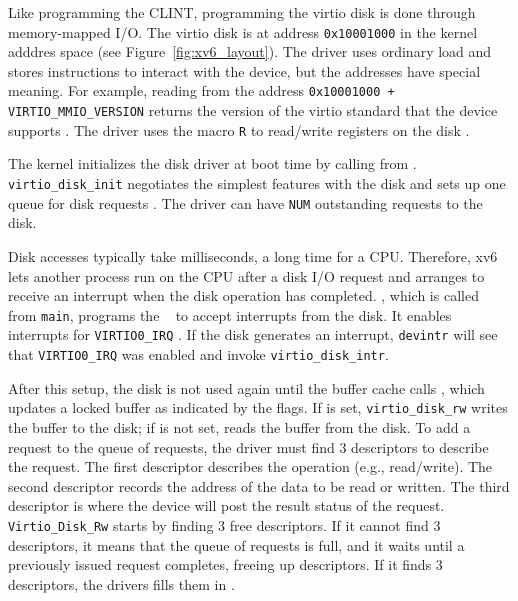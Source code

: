 Like programming the CLINT, programming the virtio disk is done
through memory-mapped I/O.  The virtio disk is at address
\lstinline{0x10001000} in the kernel adddres space (see
Figure~\ref{fig:xv6_layout}).  The driver uses ordinary load and
stores instructions to interact with the device, but the addresses
have special meaning.  For example, reading from the address
\lstinline{0x10001000 + VIRTIO_MMIO_VERSION}
 returns the version of the virtio
standard that the device supports
.  The driver uses the
macro \lstinline{R} to read/write registers on the disk
.

The kernel initializes the disk driver at boot time by calling
 from
 .
\lstinline{virtio_disk_init} negotiates the simplest features with the
disk  and sets
up one queue for disk requests .  The driver can have
\lstinline{NUM} outstanding requests to the disk.

Disk accesses typically take milliseconds, a long time for a
CPU.  Therefore, xv6 lets another process run on the CPU after a
disk I/O request and arranges to receive an interrupt when the disk
operation has completed.  
, which is called from \lstinline{main}, programs
the ~\cite{riscv:priv} to
accept interrupts from the disk.  It enables interrupts for
\lstinline{VIRTIO0_IRQ} .  If the
disk generates an interrupt, \lstinline{devintr}
 will see that
\lstinline{VIRTIO0_IRQ} was enabled and invoke
\lstinline{virtio_disk_intr}.

After this setup, the disk is not used again until the buffer cache calls
,
which updates a locked buffer
as indicated by the flags.
If
is set,
\lstinline{virtio_disk_rw}
writes the buffer
to the disk; if
is not set,
reads the buffer from the disk.
To add a request to the queue of requests, the driver must find 3
descriptors to describe the request.  The first descriptor
describes the operation (e.g., read/write).  The second descriptor
records the address of the data to be read or written. The third
descriptor is where the device will post the result status of the
request.  \lstinline{Virtio_Disk_Rw} starts by finding 3 free descriptors.  If
it cannot find 3 descriptors, it means that the queue of requests is
full, and it waits until a previously issued request completes, freeing
up descriptors.   If it finds 3 descriptors, the drivers fills them
in .

